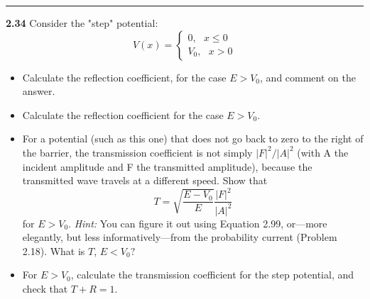 \documentclass[fleqn]{article}
\begin{document}
  \rule{15cm}{1pt}

  \textbf{2.34}
  Consider the "step" potential: 
  $$V(x)=\begin{cases}
    0, ~~~ x\leqslant 0 \\
    V_0, ~~~ x > 0
  \end{cases}$$
  \begin{itemize}
    \item Calculate the reflection coefficient, for the case $E>V_0$, and comment on the answer.

    \item Calculate the reflection coefficient for the case $E>V_0$.

    \item For a potential (such as this one) that does not go back to zero to the right of the barrier,
    the transmission coefficient is not simply $|F|^2/|A|^2$ (with A the incident amplitude and F
    the transmitted amplitude), because the transmitted wave travels at a different speed. Show
    that
    $$T=\sqrt{\dfrac{E-V_0}{E}}\dfrac{|F|^2}{|A|^2}$$
    for $E>V_0$. \emph{Hint:} You can figure it out using Equation 2.99, or—more elegantly, but less
    informatively—from the probability current (Problem 2.18). What is $T$, $E<V_0?$

    \item For $E>V_0$, calculate the transmission coefficient for the step potential, and check that $T+R=1$.
    
  \end{itemize}
\end{document}
